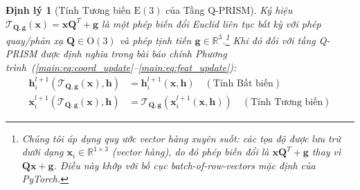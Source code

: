 \documentclass[10pt,twocolumn,letterpaper]{article}
\newtheorem{theorem}{Định lý}
\begin{document}
\begin{theorem}[Tính Tương biến $\mathrm{E}(3)$ của Tầng Q-PRISM]
\label{thm:equivariance}
Ký hiệu $\mathcal{T}_{\mathbf{Q}, \mathbf{g}}(\mathbf{x}) = \mathbf{x} \mathbf{Q}^T + \mathbf{g}$ là một phép biến đổi Euclid liên tục bất kỳ với phép quay/phản xạ $\mathbf{Q} \in \mathrm{O}(3)$ và phép tịnh tiến $\mathbf{g} \in \mathbb{R}^3$.\footnote{Chúng tôi áp dụng quy ước vector hàng xuyên suốt: các tọa độ được lưu trữ dưới dạng $\mathbf{x}_i \in \mathbb{R}^{1 \times 3}$ (vector hàng), do đó phép biến đổi là $\mathbf{x} \mathbf{Q}^T + \mathbf{g}$ thay vì $\mathbf{Q}\mathbf{x} + \mathbf{g}$. Điều này khớp với bố cục batch-of-row-vectors mặc định của PyTorch.} Khi đó đối với tầng Q-PRISM được định nghĩa trong bài báo chính Phương trình~(\ref{main:eq:coord_update}--\ref{main:eq:feat_update}):
\begin{align}
    \mathbf{h}_i^{l+1}(\mathcal{T}_{\mathbf{Q}, \mathbf{g}}(\mathbf{x}), \mathbf{h}) &= \mathbf{h}_i^{l+1}(\mathbf{x}, \mathbf{h}) \quad (\text{Tính Bất biến}) \\
    \mathbf{x}_i^{l+1}(\mathcal{T}_{\mathbf{Q}, \mathbf{g}}(\mathbf{x}), \mathbf{h}) &= \mathcal{T}_{\mathbf{Q}, \mathbf{g}}(\mathbf{x}_i^{l+1}(\mathbf{x}, \mathbf{h})) \quad (\text{Tính Tương biến})
\end{align}
\end{theorem}
\end{document}
